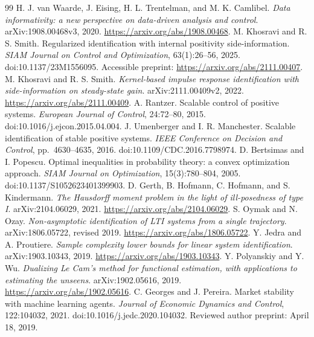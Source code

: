 \documentclass[11pt]{article}
\theoremstyle{remark}\newtheorem{remark}[proposition]{Remark}
\begin{document}
\clearpage
\begingroup\small
\begin{thebibliography}{99}
 H. J. van Waarde, J. Eising, H. L. Trentelman, and M. K. Camlibel. \emph{Data informativity: a new perspective on data-driven analysis and control}. arXiv:1908.00468v3, 2020. \url{https://arxiv.org/abs/1908.00468}.
 M. Khosravi and R. S. Smith. Regularized identification with internal positivity side-information. \emph{SIAM Journal on Control and Optimization}, 63(1):26--56, 2025. doi:10.1137/23M1556095. Accessible preprint: \url{https://arxiv.org/abs/2111.00407}.
 M. Khosravi and R. S. Smith. \emph{Kernel-based impulse response identification with side-information on steady-state gain}. arXiv:2111.00409v2, 2022. \url{https://arxiv.org/abs/2111.00409}.
 A. Rantzer. Scalable control of positive systems. \emph{European Journal of Control}, 24:72--80, 2015. doi:10.1016/j.ejcon.2015.04.004.
 J. Umenberger and I. R. Manchester. Scalable identification of stable positive systems. \emph{IEEE Conference on Decision and Control}, pp.~4630--4635, 2016. doi:10.1109/CDC.2016.7798974.
 D. Bertsimas and I. Popescu. Optimal inequalities in probability theory: a convex optimization approach. \emph{SIAM Journal on Optimization}, 15(3):780--804, 2005. doi:10.1137/S1052623401399903.
 D. Gerth, B. Hofmann, C. Hofmann, and S. Kindermann. \emph{The Hausdorff moment problem in the light of ill-posedness of type I}. arXiv:2104.06029, 2021. \url{https://arxiv.org/abs/2104.06029}.
 S. Oymak and N. Ozay. \emph{Non-asymptotic identification of LTI systems from a single trajectory}. arXiv:1806.05722, revised 2019. \url{https://arxiv.org/abs/1806.05722}.
 Y. Jedra and A. Proutiere. \emph{Sample complexity lower bounds for linear system identification}. arXiv:1903.10343, 2019. \url{https://arxiv.org/abs/1903.10343}.
 Y. Polyanskiy and Y. Wu. \emph{Dualizing Le Cam's method for functional estimation, with applications to estimating the unseens}. arXiv:1902.05616, 2019. \url{https://arxiv.org/abs/1902.05616}.
 C. Georges and J. Pereira. Market stability with machine learning agents. \emph{Journal of Economic Dynamics and Control}, 122:104032, 2021. doi:10.1016/j.jedc.2020.104032. Reviewed author preprint: April 18, 2019.

\end{thebibliography}
\end{document}

